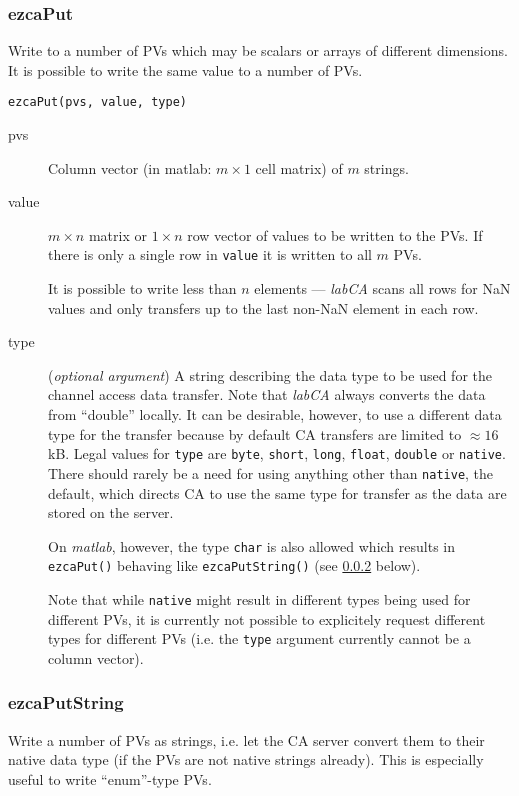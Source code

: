 \documentclass{article}
\newcommand{\sca}{{\em labCA}}
\newcommand{\matlab}{{\em matlab}}
\newcommand{\com}[1]{{\tt #1}}
\newcommand{\NAN}{\mbox{NaN}}
\newcommand{\PVITEM}{
\item[pvs] Column vector (in matlab: $m\times 1$ cell matrix)
of $m$ strings.
}
\begin{document}
\subsubsection{ezcaPut}
\label{ezcaput}
Write to a number of PVs which may be scalars or arrays of different
dimensions. It is possible to write the same value to a number of PVs.
\begin{verbatim}
ezcaPut(pvs, value, type)
\end{verbatim}
\begin{description}
\PVITEM
%
%
\item[value] $m\times n$ matrix or $1\times n$ row vector of values
to be written to the PVs. If there is only a single row in \com{value}{}
it is written to all $m$ PVs.

It is possible to write less than $n$ elements --- \sca{} scans all rows
for \NAN{} values and only transfers up to the last non-\NAN{} element in each
row.
%
%
\item[type] ({\em optional argument}) A string describing the
data type to be used for the channel access data transfer. Note
that \sca{} always converts the data from ``double'' locally. It
can be desirable, however, to use a different data type for the
transfer because by default CA transfers are limited to $\approx 16$kB.
Legal values for \com{type}{} are \com{byte}, \com{short}, \com{long},
\com{float}, \com{double} or \com{native}. There should rarely
be a need for using anything other than \com{native}, the default,
which directs CA to use the same type for transfer as the data are
stored on the server.

On \matlab{}{}, however, the type \com{char}{} is also allowed which
results in \com{ezcaPut()}{} behaving like \com{ezcaPutString()}{}
(see \ref{putstring} below).

Note that while \com{native}{} might result in different types
being used for different PVs, it is currently not possible to
explicitely request different types for different PVs (i.e. the
\com{type}{} argument currently cannot be a column vector).
%
\end{description}

\subsubsection{ezcaPutString}
\label{putstring}
Write a number of PVs as strings, i.e. let the CA server convert
them to their native data type (if the PVs are not native strings already).
This is especially useful to write ``enum''-type PVs.
\end{document}
